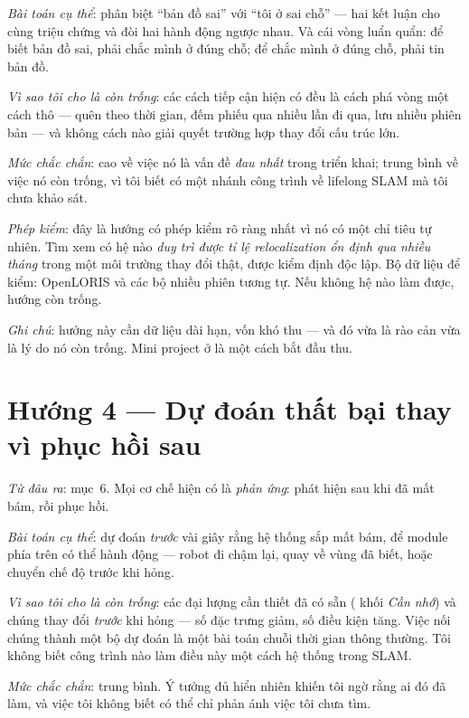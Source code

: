 \documentclass[../../vslam.tex]{subfiles}
\begin{document}
\emph{Bài toán cụ thể}: phân biệt ``bản đồ sai'' với ``tôi ở sai chỗ'' --- hai kết luận cho cùng triệu chứng và đòi hai hành động ngược nhau. Và cái vòng luẩn quẩn: để biết bản đồ sai, phải chắc mình ở đúng chỗ; để chắc mình ở đúng chỗ, phải tin bản đồ.

\emph{Vì sao tôi cho là còn trống}: các cách tiếp cận hiện có đều là cách phá vòng một cách thô --- quên theo thời gian, đếm phiếu qua nhiều lần đi qua, lưu nhiều phiên bản --- và không cách nào giải quyết trường hợp thay đổi cấu trúc lớn.

\emph{Mức chắc chắn}: cao về việc nó là vấn đề \emph{đau nhất} trong triển khai; trung bình về việc nó còn trống, vì tôi biết có một nhánh công trình về lifelong SLAM mà tôi chưa khảo sát.

\emph{Phép kiểm}: đây là hướng có phép kiểm rõ ràng nhất vì nó có một chỉ tiêu tự nhiên. Tìm xem có hệ nào \emph{duy trì được tỉ lệ relocalization ổn định qua nhiều tháng} trong một môi trường thay đổi thật, được kiểm định độc lập. Bộ dữ liệu để kiểm: OpenLORIS \cite{shi2020openloris} và các bộ nhiều phiên tương tự. Nếu không hệ nào làm được, hướng còn trống.

\emph{Ghi chú}: hướng này cần dữ liệu dài hạn, vốn khó thu --- và đó vừa là rào cản vừa là lý do nó còn trống. Mini project ở  là một cách bắt đầu thu.

\section{Hướng 4 --- Dự đoán thất bại thay vì phục hồi sau}

\emph{Từ đâu ra}:  mục~6. Mọi cơ chế hiện có là \emph{phản ứng}: phát hiện sau khi đã mất bám, rồi phục hồi.

\emph{Bài toán cụ thể}: dự đoán \emph{trước} vài giây rằng hệ thống sắp mất bám, để module phía trên có thể hành động --- robot đi chậm lại, quay về vùng đã biết, hoặc chuyển chế độ trước khi hỏng.

\emph{Vì sao tôi cho là còn trống}: các đại lượng cần thiết đã có sẵn ( khối \emph{Cần nhớ}) và chúng thay đổi \emph{trước} khi hỏng --- số đặc trưng giảm, số điều kiện tăng. Việc nối chúng thành một bộ dự đoán là một bài toán chuỗi thời gian thông thường. Tôi không biết công trình nào làm điều này một cách hệ thống trong SLAM.

\emph{Mức chắc chắn}: trung bình. Ý tưởng đủ hiển nhiên khiến tôi ngờ rằng ai đó đã làm, và việc tôi không biết có thể chỉ phản ánh việc tôi chưa tìm.
\end{document}
